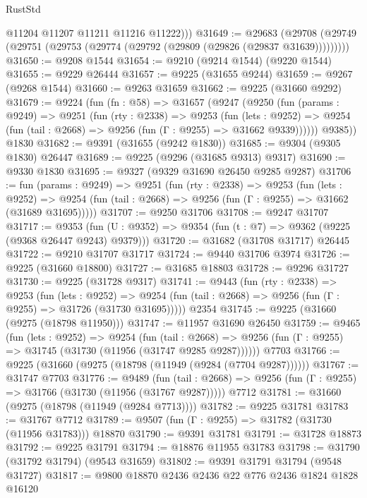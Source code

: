 \begin{lexlean}{RustStd}
\begin{coremodule}
          @11204
          @11207
          @11211
          @11216
          @11222)))
@31649 := @29683
    (@29708 (@29749 (@29751 (@29753 (@29774 (@29792 (@29809 (@29826 (@29837 @31639)))))))))
@31650 := @9208 @1544
@31654 := @9210 (@9214 @1544) (@9220 @1544)
@31655 := @9229 @26444
@31657 := @9225 (@31655 @9244)
@31659 := @9267 (@9268 @1544)
@31660 := @9263 @31659
@31662 := @9225 (@31660 @9292)
@31679 := @9224
    (fun (fn : @58) =>
    @31657
      (@9247
        (@9250
          (fun (params : @9249) =>
          @9251
            (fun (rty : @2338) =>
            @9253
              (fun (lets : @9252) =>
              @9254 (fun (tail : @2668) => @9256 (fun (Γ : @9255) => @31662 @9339))))))
        @9385))
    @1830
@31682 := @9391 (@31655 (@9242 @1830))
@31685 := @9304 (@9305 @1830) @26447
@31689 := @9225 (@9296 (@31685 @9313) @9317)
@31690 := @9330 @1830
@31695 := @9327 (@9329 @31690 @26450 @9285 @9287)
@31706 := fun (params : @9249) =>
  @9251
    (fun (rty : @2338) =>
    @9253
      (fun (lets : @9252) =>
      @9254 (fun (tail : @2668) => @9256 (fun (Γ : @9255) => @31662 (@31689 @31695)))))
@31707 := @9250 @31706
@31708 := @9247 @31707
@31717 := @9353
    (fun (U : @9352) => @9354 (fun (t : @7) => @9362 (@9225 (@9368 @26447 @9243) @9379)))
@31720 := @31682 (@31708 @31717) @26445
@31722 := @9210 @31707 @31717
@31724 := @9440 @31706 @3974
@31726 := @9225 (@31660 @18800)
@31727 := @31685 @18803
@31728 := @9296 @31727
@31730 := @9225 (@31728 @9317)
@31741 := @9443
    (fun (rty : @2338) =>
    @9253
      (fun (lets : @9252) =>
      @9254 (fun (tail : @2668) => @9256 (fun (Γ : @9255) => @31726 (@31730 @31695)))))
    @2354
@31745 := @9225 (@31660 (@9275 (@18798 @11950)))
@31747 := @11957 @31690 @26450
@31759 := @9465
    (fun (lets : @9252) =>
    @9254
      (fun (tail : @2668) =>
      @9256 (fun (Γ : @9255) => @31745 (@31730 (@11956 (@31747 @9285 @9287))))))
    @7703
@31766 := @9225 (@31660 (@9275 (@18798 (@11949 (@9284 (@7704 @9287))))))
@31767 := @31747 @7703
@31776 := @9489
    (fun (tail : @2668) => @9256 (fun (Γ : @9255) => @31766 (@31730 (@11956 (@31767 @9287)))))
    @7712
@31781 := @31660 (@9275 (@18798 (@11949 (@9284 @7713))))
@31782 := @9225 @31781
@31783 := @31767 @7712
@31789 := @9507 (fun (Γ : @9255) => @31782 (@31730 (@11956 @31783))) @18870
@31790 := @9391 @31781
@31791 := @31728 @18873
@31792 := @9225 @31791
@31794 := @18876 @11955 @31783
@31798 := @31790 (@31792 @31794) (@9543 @31659)
@31802 := @9391 @31791 @31794 (@9548 @31727)
@31817 := @9800
    @18870
    @2436
    @2436
    @22
    @776
    @2436
    @1824
    @1828
    @16120

\end{coremodule}
\end{lexlean}
